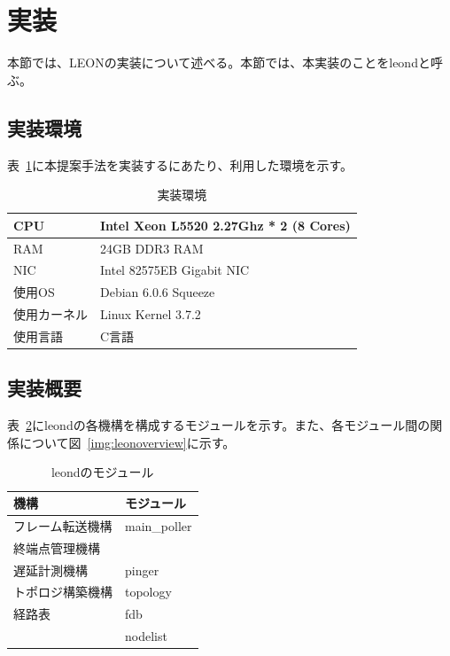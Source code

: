 \section{実装}
\label{solv:coding}

本節では、LEONの実装について述べる。本節では、本実装のことをleondと呼ぶ。

\subsection{実装環境}
\label{solv:codeenv}

表~\ref{table:codingenv}に本提案手法を実装するにあたり、利用した環境を示す。

\begin{table}[h]
	\begin{center}
		\caption{実装環境}
		\begin{tabular}{|l|l|}
			\hline
			CPU & Intel Xeon L5520 2.27Ghz * 2 (8 Cores) \\
			\hline
			RAM & 24GB DDR3 RAM \\
			\hline
			NIC & Intel 82575EB Gigabit NIC \\
			\hline
			使用OS & Debian 6.0.6 Squeeze \\
			\hline
			使用カーネル & Linux Kernel 3.7.2 \\
			\hline
			使用言語 & C言語 \\
			\hline
		\end{tabular}
		\label{table:codingenv}
	\end{center}
\end{table}

\subsection{実装概要}
\label{code:abst}

表~\ref{table:leonmods}にleondの各機構を構成するモジュールを示す。また、各モジュール間の関
係について図~\ref{img:leonoverview}に示す。

\begin{table}[h]
\begin{center}
	\caption{leondのモジュール}
	\begin{tabular}{|l|l|}
		\hline
		機構 & モジュール \\
		\hline
		\hline
		フレーム転送機構 & main\_poller \\
		終端点管理機構   & \\
		\hline
		遅延計測機構     & pinger \\
		\hline
		トポロジ構築機構 & topology \\
		\hline
		経路表 & fdb  \\
		       & nodelist \\
		\hline
	\end{tabular}
	\label{table:leonmods}
\end{center}
\end{table}


